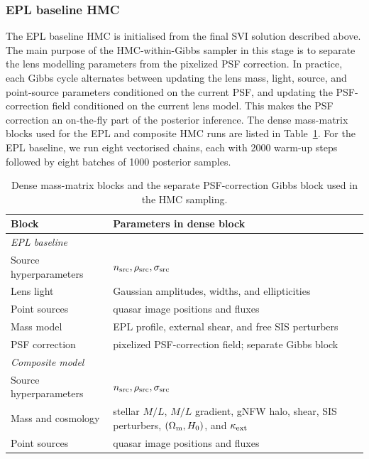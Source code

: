 \documentclass[fleqn,usenatbib]{mnras}
\begin{document}
\subsubsection{EPL baseline HMC}

The EPL baseline HMC is initialised from the final SVI solution described above. The main purpose of the HMC-within-Gibbs sampler in this stage is to separate the lens modelling parameters from the pixelized PSF correction. In practice, each Gibbs cycle alternates between updating the lens mass, light, source, and point-source parameters conditioned on the current PSF, and updating the PSF-correction field conditioned on the current lens model. This makes the PSF correction an on-the-fly part of the posterior inference. The dense mass-matrix blocks used for the EPL and composite HMC runs are listed in Table~\ref{tab:hmc_blocks}. For the EPL baseline, we run eight vectorised chains, each with 2000 warm-up steps followed by eight batches of 1000 posterior samples.

\begin{table}
\centering
\small
\renewcommand{\arraystretch}{1.1}
\setlength{\tabcolsep}{4pt}
\begin{tabular}{@{}p{}p{}@{}}
\hline
\textbf{Block} & \textbf{Parameters in dense block} \\
\hline
\multicolumn{2}{l}{\emph{EPL baseline}}\\
Source hyperparameters & \(n_{\rm src}, \rho_{\rm src}, \sigma_{\rm src}\) \\
Lens light & Gaussian amplitudes, widths, and ellipticities \\
Point sources & quasar image positions and fluxes \\
Mass model & EPL profile, external shear, and free SIS perturbers \\
PSF correction & pixelized PSF-correction field; separate Gibbs block \\
\hline
\multicolumn{2}{l}{\emph{Composite model}}\\
Source hyperparameters & \(n_{\rm src}, \rho_{\rm src}, \sigma_{\rm src}\) \\
Mass and cosmology & stellar \(M/L\), \(M/L\) gradient, gNFW halo, shear, SIS perturbers, \((\Omega_{\rm m},H_0)\), and \(\kappa_{\rm ext}\) \\
Point sources & quasar image positions and fluxes \\
\hline
\end{tabular}
\caption{Dense mass-matrix blocks and the separate PSF-correction Gibbs block used in the HMC sampling.}
\label{tab:hmc_blocks}
\end{table}
\end{document}
